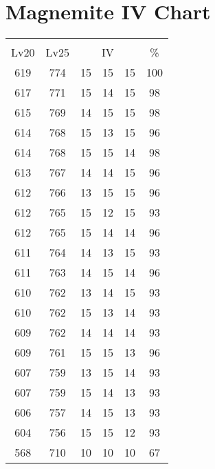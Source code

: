 \documentclass{article}%
\begin{document}
%
\normalsize%
\section{Magnemite IV Chart}%
\label{sec:Magnemite IV Chart}%
\renewcommand{\arraystretch}{1.5}%
\begin{tabular}{|c|c|c|c|c|c|}%
\hline%
\multicolumn{6}{|c|}{\textcolor{white}{ 
\linebreak{Magnemite}
}%
\cellcolor{black}}\\%
\multicolumn{1}{|c}{Lv20}&\multicolumn{1}{c|}{Lv25}&\multicolumn{3}{c|}{IV}&\multicolumn{1}{|c|}{\%}\\%
\hline%
\rowcolor{color100}%
619&774&15&15&15&100\\%
\hline%
\rowcolor{color98}%
617&771&15&14&15&98\\%
\hline%
\rowcolor{color98}%
615&769&14&15&15&98\\%
\hline%
\rowcolor{color96}%
614&768&15&13&15&96\\%
\hline%
\rowcolor{color98}%
614&768&15&15&14&98\\%
\hline%
\rowcolor{color96}%
613&767&14&14&15&96\\%
\hline%
\rowcolor{color96}%
612&766&13&15&15&96\\%
\hline%
\rowcolor{color93}%
612&765&15&12&15&93\\%
\hline%
\rowcolor{color96}%
612&765&15&14&14&96\\%
\hline%
\rowcolor{color93}%
611&764&14&13&15&93\\%
\hline%
\rowcolor{color96}%
611&763&14&15&14&96\\%
\hline%
\rowcolor{color93}%
610&762&13&14&15&93\\%
\hline%
\rowcolor{color93}%
610&762&15&13&14&93\\%
\hline%
\rowcolor{color93}%
609&762&14&14&14&93\\%
\hline%
\rowcolor{color96}%
609&761&15&15&13&96\\%
\hline%
\rowcolor{color93}%
607&759&13&15&14&93\\%
\hline%
\rowcolor{color93}%
607&759&15&14&13&93\\%
\hline%
\rowcolor{color93}%
606&757&14&15&13&93\\%
\hline%
\rowcolor{color93}%
604&756&15&15&12&93\\%
\hline%
\rowcolor{color91}%
568&710&10&10&10&67\\%
\end{tabular}

%
\end{document}
